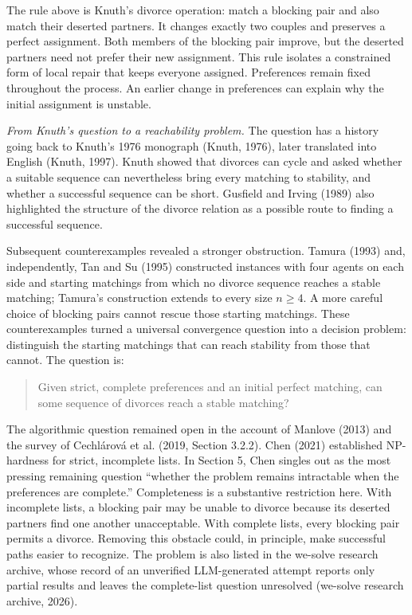 \documentclass[11pt,letterpaper]{article}
\theoremstyle{definition}
\begin{document}
The rule above is Knuth's divorce operation: match a blocking pair and also match their deserted partners. It changes exactly two couples and preserves a perfect assignment. Both members of the blocking pair improve, but the deserted partners need not prefer their new assignment. This rule isolates a constrained form of local repair that keeps everyone assigned. Preferences remain fixed throughout the process. An earlier change in preferences can explain why the initial assignment is unstable.

\medskip\noindent\textit{From Knuth's question to a reachability problem.}
The question has a history going back to Knuth's 1976 monograph (Knuth, 1976), later translated into English (Knuth, 1997). Knuth showed that divorces can cycle and asked whether a suitable sequence can nevertheless bring every matching to stability, and whether a successful sequence can be short. Gusfield and Irving (1989) also highlighted the structure of the divorce relation as a possible route to finding a successful sequence.

Subsequent counterexamples revealed a stronger obstruction. Tamura (1993) and, independently, Tan and Su (1995) constructed instances with four agents on each side and starting matchings from which no divorce sequence reaches a stable matching; Tamura's construction extends to every size $n\ge 4$. A more careful choice of blocking pairs cannot rescue those starting matchings. These counterexamples turned a universal convergence question into a decision problem: distinguish the starting matchings that can reach stability from those that cannot. The question is:
\begin{quote}
Given strict, complete preferences and an initial perfect matching, can some sequence of divorces reach a stable matching?
\end{quote}
The algorithmic question remained open in the account of Manlove (2013) and the survey of Cechlárová et al. (2019, Section 3.2.2). Chen (2021) established NP-hardness for strict, incomplete lists. In Section 5, Chen singles out as the most pressing remaining question ``whether the problem remains intractable when the preferences are complete.'' Completeness is a substantive restriction here. With incomplete lists, a blocking pair may be unable to divorce because its deserted partners find one another unacceptable. With complete lists, every blocking pair permits a divorce. Removing this obstacle could, in principle, make successful paths easier to recognize. The problem is also listed in the we-solve research archive, whose record of an unverified LLM-generated attempt reports only partial results and leaves the complete-list question unresolved (we-solve research archive, 2026).
\end{document}
